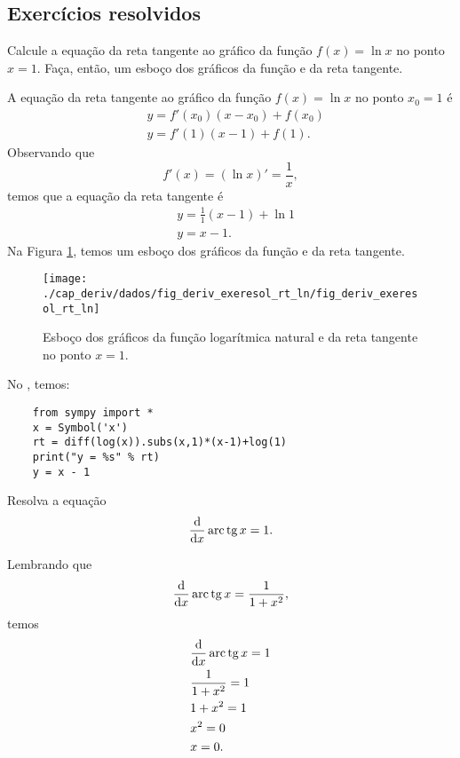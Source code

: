 \subsection{Exercícios resolvidos}

\begin{exeresol}
  Calcule a equação da reta tangente ao gráfico da função $f(x) = \ln x$ no ponto $x=1$. Faça, então, um esboço dos gráficos da função e da reta tangente.
\end{exeresol}
\begin{resol}
  A equação da reta tangente ao gráfico da função $f(x) = \ln x$ no ponto $x_0=1$ é
  \begin{align}
    & y = f'(x_0)(x-x_0)+f(x_0) \\
    & y = f'(1)(x-1)+f(1).
  \end{align}
  Observando que
  \begin{equation}
    f'(x) = (\ln x)' = \frac{1}{x},
  \end{equation}
  temos que a equação da reta tangente é
  \begin{align}
    & y = \frac{1}{1}(x-1)+\ln 1 \\
    & y = x-1.
  \end{align}
  Na Figura \ref{fig:deriv_exeresol_rt_ln}, temos um esboço dos gráficos da função e da reta tangente.

  \begin{figure}[H]
    \centering
    \texttt{[image: ./cap\_deriv/dados/fig\_deriv\_exeresol\_rt\_ln/fig\_deriv\_exeresol\_rt\_ln]}
    \caption{Esboço dos gráficos da função logarítmica natural e da reta tangente no ponto $x=1$.}
    \label{fig:deriv_exeresol_rt_ln}
  \end{figure}

  \ifispython
  No \sympy, temos:
  \begin{lstlisting}
    from sympy import *
    x = Symbol('x')
    rt = diff(log(x)).subs(x,1)*(x-1)+log(1)
    print("y = %s" % rt)
    y = x - 1
  \end{lstlisting}
  \fi    
\end{resol}

\begin{exeresol}
  Resolva a equação
  \begin{equation}
    \frac{\mathrm{d}}{\mathrm{d} x}\operatorname{arc}\operatorname{tg} x = 1.
  \end{equation}
\end{exeresol}
\begin{resol}
  Lembrando que
  \begin{equation}
    \frac{\mathrm{d}}{\mathrm{d} x}\operatorname{arc}\operatorname{tg} x = \frac{1}{1+x^2},
  \end{equation}
  temos
  \begin{align}
    & \frac{\mathrm{d}}{\mathrm{d} x}\operatorname{arc}\operatorname{tg} x = 1 \\
    & \frac{1}{1+x^2}=1 \\
    & 1+x^2 = 1 \\
    & x^2 = 0 \\
    & x = 0.
  \end{align}
\end{resol}

